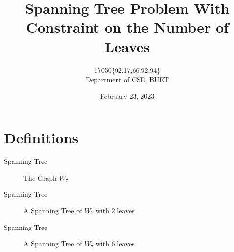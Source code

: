 \documentclass{beamer}
\title{Spanning Tree Problem With Constraint on the Number of Leaves}
\author{17050\{02,17,66,92,94\} \\ Department of CSE, BUET}
\date{February 23, 2023}
\begin{document}
\begin{frame}
\centering
\maketitle
\end{frame}

\section{Definitions}


\begin{frame}{Spanning Tree}
\begin{figure}
  \vspace{1 cm}
  \caption{The Graph $W_7$}
\end{figure}
\end{frame}
\begin{frame}{Spanning Tree}
\begin{figure}
  \vspace{1 cm}
  \caption{A Spanning Tree of $W_7$ with $2$ leaves}
\end{figure}
\end{frame}
\begin{frame}{Spanning Tree}
\begin{figure}
  \vspace{1 cm}
  \caption{A Spanning Tree of $W_7$ with $6$ leaves}
\end{figure}
\end{frame}
\end{document}
